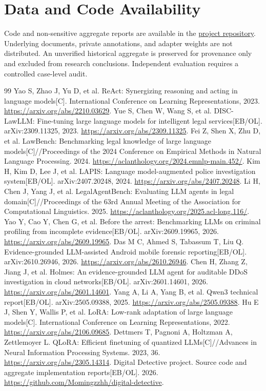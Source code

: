 \documentclass[10pt,a4paper]{article}
\begin{document}
\clearpage
\section*{Data and Code Availability}
Code and non-sensitive aggregate reports are available in the \href{https://github.com/Momingzzhh/digital-detective}{project repository}. Underlying documents, private annotations, and adapter weights are not distributed. An unverified historical aggregate is preserved for provenance only and excluded from research conclusions. Independent evaluation requires a controlled case-level audit.

\begin{thebibliography}{99}\setlength{\itemsep}{0pt}
 Yao S, Zhao J, Yu D, et al. ReAct: Synergizing reasoning and acting in language models[C]. International Conference on Learning Representations, 2023. \url{https://arxiv.org/abs/2210.03629}.
 Yue S, Chen W, Wang S, et al. DISC-LawLLM: Fine-tuning large language models for intelligent legal services[EB/OL]. arXiv:2309.11325, 2023. \url{https://arxiv.org/abs/2309.11325}.
 Fei Z, Shen X, Zhu D, et al. LawBench: Benchmarking legal knowledge of large language models[C]//Proceedings of the 2024 Conference on Empirical Methods in Natural Language Processing. 2024. \url{https://aclanthology.org/2024.emnlp-main.452/}.
 Kim H, Kim D, Lee J, et al. LAPIS: Language model-augmented police investigation system[EB/OL]. arXiv:2407.20248, 2024. \url{https://arxiv.org/abs/2407.20248}.
 Li H, Chen J, Yang J, et al. LegalAgentBench: Evaluating LLM agents in legal domain[C]//Proceedings of the 63rd Annual Meeting of the Association for Computational Linguistics. 2025. \url{https://aclanthology.org/2025.acl-long.116/}.
 Yao Y, Cao Y, Chen G, et al. Before the arrest: Benchmarking LLMs on criminal profiling from incomplete evidence[EB/OL]. arXiv:2609.19965, 2026. \url{https://arxiv.org/abs/2609.19965}.
 Das M C, Ahmed S, Tabassum T, Liu Q. Evidence-grounded LLM-assisted Android mobile forensic reporting[EB/OL]. arXiv:2610.26946, 2026. \url{https://arxiv.org/abs/2610.26946}.
 Chen H, Zhang Z, Jiang J, et al. Holmes: An evidence-grounded LLM agent for auditable DDoS investigation in cloud networks[EB/OL]. arXiv:2601.14601, 2026. \url{https://arxiv.org/abs/2601.14601}.
 Yang A, Li A, Yang B, et al. Qwen3 technical report[EB/OL]. arXiv:2505.09388, 2025. \url{https://arxiv.org/abs/2505.09388}.
 Hu E J, Shen Y, Wallis P, et al. LoRA: Low-rank adaptation of large language models[C]. International Conference on Learning Representations, 2022. \url{https://arxiv.org/abs/2106.09685}.
 Dettmers T, Pagnoni A, Holtzman A, Zettlemoyer L. QLoRA: Efficient finetuning of quantized LLMs[C]//Advances in Neural Information Processing Systems. 2023, 36. \url{https://arxiv.org/abs/2305.14314}.
 Digital Detective project. Source code and aggregate implementation reports[EB/OL]. 2026. \url{https://github.com/Momingzzhh/digital-detective}.
\end{thebibliography}
\end{document}
